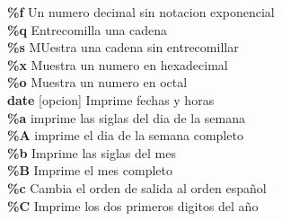 \documentclass[11pt]{article}
\begin{document}
\hspace{2cm}\textbf{\%f}\hspace{2cm} Un numero decimal sin notacion exponencial\\

\hspace{2cm}\textbf{\%q}\hspace{2cm} Entrecomilla una cadena\\

\hspace{2cm} \textbf{\%s}
\hspace{2cm} MUestra una cadena sin entrecomillar\\

\hspace{2cm}\textbf{\%x}
\hspace{2cm} Muestra un numero en hexadecimal\\

\hspace{2cm}\textbf{\%o} \hspace{2cm} Muestra un numero en octal \\




\textbf{date} [opcion] \hspace{2cm} Imprime fechas y horas\\

\hspace{2cm} \textbf{\%a}\hspace{2cm} imprime las siglas del dia de la semana\\

\hspace{2cm} \textbf{\%A} \hspace{2cm} imprime el dia de la semana completo\\

\hspace{2cm} \textbf{\%b} \hspace{2cm} Imprime las siglas del mes \\

\hspace{2cm} \textbf{\%B} \hspace{2cm} Imprime el mes completo\\

\hspace{2cm} \textbf{\%c}
\hspace{2cm} Cambia el orden de salida al orden español\\

\hspace{2cm} \textbf{\%C}
\hspace{2cm} Imprime los dos primeros digitos del año\\
\end{document}
